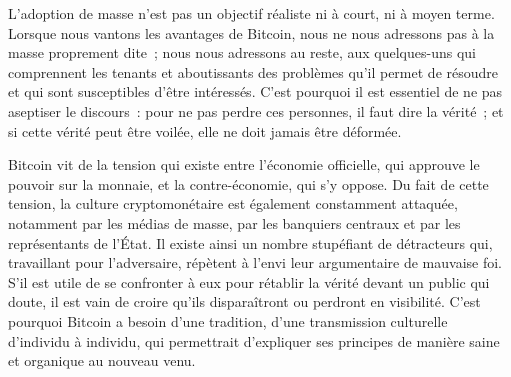 L'adoption de masse n'est pas un objectif réaliste ni à court, ni à moyen terme. Lorsque nous vantons les avantages de Bitcoin, nous ne nous adressons pas à la masse proprement dite~; nous nous adressons au reste, aux quelques-uns qui comprennent les tenants et aboutissants des problèmes qu'il permet de résoudre et qui sont susceptibles d'être intéressés. C'est pourquoi il est essentiel de ne pas aseptiser le discours~: pour ne pas perdre ces personnes, il faut dire la vérité~; et si cette vérité peut être voilée, elle ne doit jamais être déformée. %


Bitcoin vit de la tension qui existe entre l'économie officielle, qui approuve le pouvoir sur la monnaie, et la contre-économie, qui s'y oppose. Du fait de cette tension, la culture cryptomonétaire est également constamment attaquée, notamment par les médias de masse, par les banquiers centraux et par les représentants de l'État. Il existe ainsi un nombre stupéfiant de détracteurs qui, travaillant pour l'adversaire, répètent à l'envi leur argumentaire de mauvaise foi. S'il est utile de se confronter à eux pour rétablir la vérité devant un public qui doute, il est vain de croire qu'ils disparaîtront ou perdront en visibilité. C'est pourquoi Bitcoin a besoin d'une tradition, d'une transmission culturelle d'individu à individu, qui permettrait d'expliquer ses principes de manière saine et organique au nouveau venu. %

